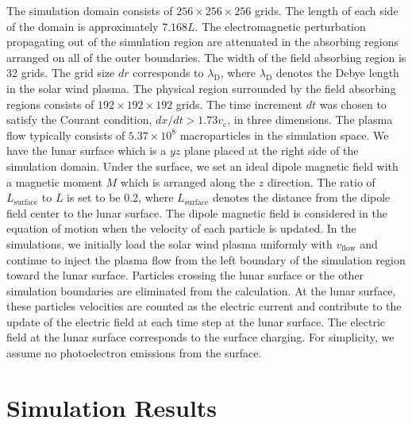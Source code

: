 \documentclass[draft,jgrga]{agutex2015}
\begin{document}
\begin{article}
The  simulation domain consists of $256 \times 256 \times 256$ grids. 
The length of each side of the domain is approximately $7.168L$. 
The electromagnetic perturbation propagating out of the simulation region
are attenuated in the absorbing regions arranged on all of the outer boundaries. 
The width of the field absorbing region is 32 grids.
The grid size $dr$ corresponds to $\lambda_\mathrm{D}$, 
where $\lambda_\mathrm{D}$ denotes the Debye length in the solar wind plasma.
The physical region surrounded by the field absorbing regions consists of 
$192 \times 192 \times 192$ grids. 
The time increment $dt$ was chosen to satisfy 
the Courant condition, $dx/dt > 1.73 v_\mathrm{c}$, in three dimensions. 
The plasma flow typically consists of $5.37 \times 10^8 $ macroparticles in the simulation space. 
We have the lunar surface which is a $yz$ plane placed 
at the right side of the simulation domain.
Under the surface, we set an ideal dipole magnetic field with 
a magnetic moment $M$ which is arranged along the $z$ direction. 
The ratio of $L_\mathrm{surface}$ to $L$ is set to be 0.2, 
where $L_\mathrm{surface}$ denotes
the distance from the dipole field center to the lunar surface.
The dipole magnetic field is considered in the equation of motion 
when the velocity of each particle is updated. 
In the simulations, 
we initially load the solar wind plasma uniformly with $v_\mathrm{flow}$
and continue to inject the plasma flow from the left boundary of the simulation region
toward the lunar surface.
Particles crossing the lunar surface or the other simulation boundaries are 
eliminated from the calculation. 
At the lunar surface, these particles velocities are counted as the electric current and 
contribute to the update of the electric field at each time step at the lunar surface. 
The electric field at the lunar surface corresponds to the surface charging.
For simplicity, we assume no photoelectron emissions from the surface. 

\section{Simulation Results}


\end{article}
\end{document}
